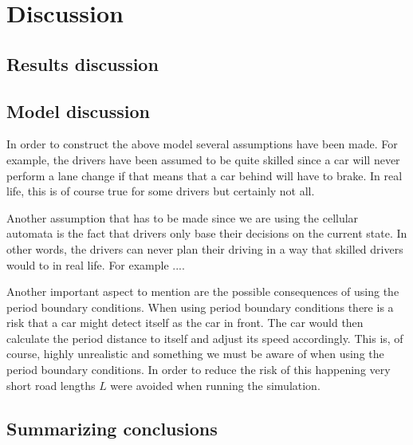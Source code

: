 \documentclass[a4paper,12pt]{article}
\begin{document}
\section*{Discussion}
\subsection*{Results discussion}

\subsection*{Model discussion}
In order to construct the above model several assumptions have been made. For example, the drivers have been assumed to be quite skilled
since a car will never perform a lane change if that means that a car behind will have to brake. In real life, this is of course true for some drivers 
but certainly not all.

Another assumption that has to be made since we are using the cellular automata is the fact that drivers only base their decisions on the current state. In other words, 
the drivers can never plan their driving in a way that skilled drivers would to in real life. For example ....

Another important aspect to mention are the possible consequences of using the period boundary conditions. When using period boundary conditions there is a risk
that a car might detect itself as the car in front. The car would then calculate the period distance to itself and adjust its speed accordingly. 
This is, of course, highly unrealistic and something we must be aware of when using the period boundary conditions. In order to reduce the risk of this happening
very short road lengths $L$ were avoided when running the simulation.

\subsection*{Summarizing conclusions}
\end{document}
